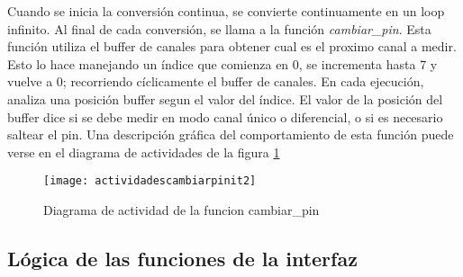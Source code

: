 Cuando se inicia la conversión continua, se convierte continuamente en un loop infinito. Al final de cada conversión, se llama a la función \textit{cambiar\_pin}. Esta función utiliza el buffer de canales para obtener cual es el proximo canal a medir. Esto lo hace manejando un índice que comienza en 0, se incrementa hasta 7 y vuelve a 0; recorriendo cíclicamente el buffer de canales. 
En cada ejecución, analiza una posición buffer segun el valor del índice. El valor de la posición del buffer dice si se debe medir en modo canal único o diferencial, o si es necesario saltear el pin. Una descripción gráfica del comportamiento de esta función puede verse en el diagrama de actividades de la figura \ref{fig:actividadescambiarpinit2} \\


\begin{figure}[h]
  \centering
  \texttt{[image: actividadescambiarpinit2]}
  \caption{Diagrama de actividad de la funcion cambiar\_pin}\label{fig:actividadescambiarpinit2}
\end{figure}




\subsection{Lógica de las funciones de la interfaz} %
\label{it2:sub:logica_de_las_funciones_de_la_interfaz}

